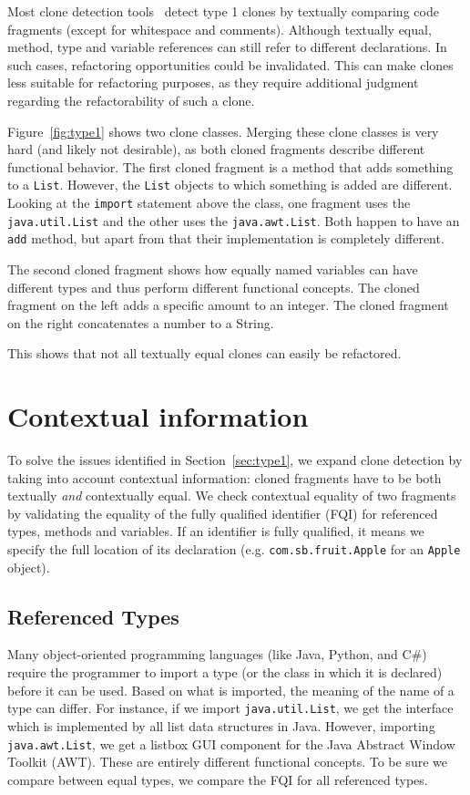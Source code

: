 \documentclass[conference]{IEEEtran}
\begin{document}
Most clone detection tools~\cite{kamiya2002ccfinder, semura2017ccfindersw, roy2008nicad, svajlenko2016bigcloneeval, svajlenko2014evaluating} detect type 1 clones by textually comparing code fragments (except for whitespace and comments). Although textually equal, method, type and variable references can still refer to different declarations. In such cases, refactoring opportunities could be invalidated. This can make clones less suitable for refactoring purposes, as they require additional judgment regarding the refactorability of such a clone.

Figure~\ref{fig:type1} shows two clone classes. Merging these clone classes is very hard (and likely not desirable), as both cloned fragments describe different functional behavior. The first cloned fragment is a method that adds something to a \texttt{List}. However, the \texttt{List} objects to which something is added are different. Looking at the \texttt{import} statement above the class, one fragment uses the \texttt{java.util.List} and the other uses the \texttt{java.awt.List}. Both happen to have an \texttt{add} method, but apart from that their implementation is completely different.

The second cloned fragment shows how equally named variables can have different types and thus perform different functional concepts. The cloned fragment on the left adds a specific amount to an integer. The cloned fragment on the right concatenates a number to a String.

This shows that not all textually equal clones can easily be refactored.

\section{Contextual information}
To solve the issues identified in Section~\ref{sec:type1}, we expand clone detection by taking into account contextual information: cloned fragments have to be both textually \textit{and} contextually equal. We check contextual equality of two fragments by validating the equality of the fully qualified identifier (FQI) for referenced types, methods and variables. If an identifier is fully qualified, it means we specify the full location of its declaration (e.g. \texttt{com.sb.fruit.Apple} for an \texttt{Apple} object).

\subsection{Referenced Types}
Many object-oriented programming languages (like Java, Python, and C\#) require the programmer to import a type (or the class in which it is declared) before it can be used. Based on what is imported, the meaning of the name of a type can differ. For instance, if we import \texttt{java.util.List}, we get the interface which is implemented by all list data structures in Java. However, importing \texttt{java.awt.List}, we get a listbox GUI component for the Java Abstract Window Toolkit (AWT). These are entirely different functional concepts. To be sure we compare between equal types, we compare the FQI for all referenced types.
\end{document}

